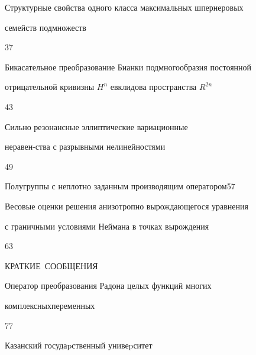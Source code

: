 



{Структурные свойства одного класса максимальных шпернеровых \newline


семейств подмножеств}{37}




{Бикасательное преобразование Бианки подмногообразия постоянной\newline


отрицательной кривизны $H^n$ евклидова пространства $R^{2n}$}{43}




{Сильно резонансные эллиптические вариационные


неравен-\newline ства с разрывными нелинейностями}{49}




{Полугруппы с неплотно заданным производящим оператором}{57}




{Весовые оценки решения анизотропно вырождающегося уравнения\newline


с граничными условиями Неймана в точках вырождения}{63}











\bigskip


\centerline{\Large КРАТКИЕ~СООБЩЕНИЯ}


\bigskip







{Оператор преобразования Радона целых функций многих 


комплексных\newline переменных}{77}








\vfill


\noindent\raisebox{2pt}{\copyright} Казанский госудаpственный унивеpситет





